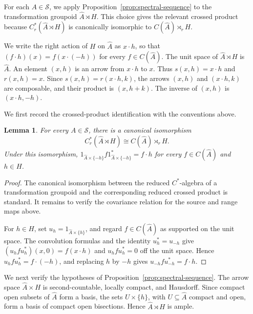 \documentclass[pdflatex,sn-mathphys-num]{sn-jnl}%
\theoremstyle{plain}
\newtheorem{lemma}[theorem]{Lemma}
\theoremstyle{remark}
\theoremstyle{definition}
\numberwithin{equation}{section}
\begin{document}
For each \( A\in\mathcal S \), we apply Proposition~\ref{prop:spectral-sequence} to the transformation groupoid \( \widehat A\rtimes H \). This choice gives the relevant crossed product because \( C_r^*(\widehat A\rtimes H) \) is canonically isomorphic to \( C(\widehat A)\rtimes_rH \).

We write the right action of \( H \) on \( \widehat A \) as \( x\cdot h \), so that \( (f\cdot h)(x)=f(x\cdot(-h)) \) for every \( f\in C(\widehat A) \). The unit space of \( \widehat A\rtimes H \) is \( \widehat A \). An element \( (x,h) \) is an arrow from \( x\cdot h \) to \( x \). Thus \( s(x,h)=x\cdot h \) and \( r(x,h)=x \). Since \( s(x,h)=r(x\cdot h,k) \), the arrows \( (x,h) \) and \( (x\cdot h,k) \) are composable, and their product is \( (x,h+k) \). The inverse of \( (x,h) \) is \( (x\cdot h,-h) \).

We first record the crossed-product identification with the conventions above.

\begin{lemma}
\label{lem:transformation-groupoid-crossed-product}
For every \( A\in\mathcal S \), there is a canonical isomorphism
\[
C_r^*(\widehat A\rtimes H)
\cong 
C(\widehat A)\rtimes_rH.
\]
Under this isomorphism, \( 1_{\widehat A\times\{-h\}}f1_{\widehat A\times\{-h\}}^*=f\cdot h \) for every \( f\in C(\widehat A) \) and \( h\in H \).
\end{lemma}

\begin{proof}
The canonical isomorphism between the reduced \( C^* \)-algebra of a transformation groupoid and the corresponding reduced crossed product is standard. It remains to verify the covariance relation for the source and range maps above.

For \( h\in H \), set \( u_h=1_{\widehat A\times\{h\}} \), and regard \( f\in C(\widehat A) \) as supported on the unit space. The convolution formulas and the identity \( u_h^*=u_{-h} \) give \( (u_hfu_h^*)(x,0)=f(x\cdot h) \) and \( u_hfu_h^*=0 \) off the unit space. Hence \( u_hfu_h^*=f\cdot(-h) \), and replacing \( h \) by \( -h \) gives \( u_{-h}fu_{-h}^*=f\cdot h \).
\end{proof}

We next verify the hypotheses of Proposition~\ref{prop:spectral-sequence}. The arrow space \( \widehat A\times H \) is second-countable, locally compact, and Hausdorff. Since compact open subsets of \( \widehat A \) form a basis, the sets \( U\times\{h\} \), with \( U\subseteq\widehat A \) compact and open, form a basis of compact open bisections. Hence \( \widehat A\rtimes H \) is ample.
\end{document}
